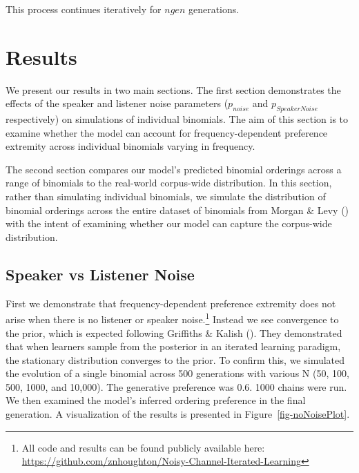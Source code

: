 \documentclass[
  12pt,
  letterpaper,
]{scrreprt}
\begin{document}
This process continues iteratively for \(ngen\) generations.

\section{Results}\label{results-10}

We present our results in two main sections. The first section
demonstrates the effects of the speaker and listener noise parameters
(\(p_{noise}\) and \(p_{SpeakerNoise}\) respectively) on simulations of
individual binomials. The aim of this section is to examine whether the
model can account for frequency-dependent preference extremity across
individual binomials varying in frequency.

The second section compares our model's predicted binomial orderings
across a range of binomials to the real-world corpus-wide distribution.
In this section, rather than simulating individual binomials, we
simulate the distribution of binomial orderings across the entire
dataset of binomials from Morgan \& Levy
() with the intent of examining whether
our model can capture the corpus-wide distribution.

\subsection{Speaker vs Listener Noise}\label{speaker-vs-listener-noise}

First we demonstrate that frequency-dependent preference extremity does
not arise when there is no listener or speaker noise.\footnote{All code
  and results can be found publicly available here:
  \href{https://github.com/znhoughton/Noisy-Channel-Iterated-Learning\%7D\%7D}{https://github.com/znhoughton/Noisy-Channel-Iterated-Learning}}
Instead we see convergence to the prior, which is expected following
Griffiths \& Kalish
(). They
demonstrated that when learners sample from the posterior in an iterated
learning paradigm, the stationary distribution converges to the prior.
To confirm this, we simulated the evolution of a single binomial across
500 generations with various N (50, 100, 500, 1000, and 10,000). The
generative preference was 0.6. 1000 chains were run. We then examined
the model's inferred ordering preference in the final generation. A
visualization of the results is presented in
Figure~\ref{fig-noNoisePlot}.
\end{document}
